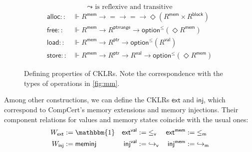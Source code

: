 \documentclass[sigplan,10pt,review]{acmart}
\newcommand{\figsize}{\small}
\newcommand{\kw}[1]{\ensuremath{ \mathsf{#1} }}
\newcommand{\vref}{\le_\kw{v}}
\newcommand{\mext}{\le_\kw{m}}
\begin{document}
\begin{figure} %
  \figsize
  \begin{gather*}
    {\leadsto} \mbox{ is reflexive and transitive}
  \end{gather*}
  \begin{align*}
      \kw{alloc} ::
        &\Vdash R^\kw{mem} \rightarrow {=} \rightarrow {=} \rightarrow
        \Diamond (R^\kw{mem} \times R^\kw{block})
      \\
      \kw{free} ::
        &\Vdash R^\kw{mem} \rightarrow R^\kw{ptrrange} \rightarrow
        \kw{option}^\le(\Diamond R^\kw{mem})
      \\
      \kw{load} ::
        &\Vdash R^\kw{mem} \rightarrow R^\kw{ptr} \rightarrow
        \kw{option}^\le(R^\kw{val})
      \\
      \kw{store} ::
        &\Vdash R^\kw{mem} \rightarrow R^\kw{ptr} \rightarrow R^\kw{val} \rightarrow
        \kw{option}^\le(\Diamond R^\kw{mem})
  \end{align*}
  \caption{Defining properties of CKLRs.
    Note the correspondence with
    the types of operations in \autoref{fig:mm}.}
  \label{fig:cklr-def}
\end{figure}

Among other constructions,
we can define
the CKLRs $\kw{ext}$ and $\kw{inj}$,
which correspond to
CompCert's memory extensions and memory injections.
Their component relations for values and memory states
coincide with the usual ones:
\begin{align*}
  W_\kw{ext} &:= \mathbbm{1} &
  \kw{ext}^\kw{val} &:= {\vref} &
  \kw{ext}^\kw{mem} &:= {\mext} \\
  W_\kw{inj} &:= \kw{meminj} &
  \kw{inj}^\kw{val} &:= {\hookrightarrow_\kw{v}} &
  \kw{inj}^\kw{mem} &:= {\hookrightarrow_\kw{m}}
\end{align*}
\end{document}
